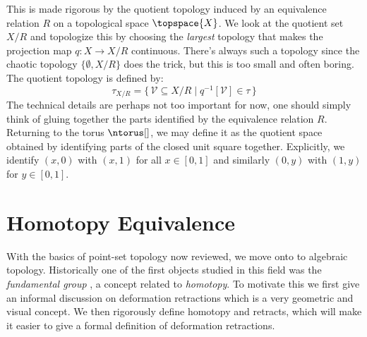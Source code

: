 \documentclass{book}                                                           %
\begin{document}
                This is made rigorous by the quotient topology induced by an
                equivalence relation $R$ on a topological space
                $\topspace{X}$. We look at the quotient
                set $X/R$ and topologize this by choosing the \textit{largest}
                topology that makes the projection map $q:X\rightarrow{X}/R$
                continuous. There's always such a topology since the chaotic
                topology $\{\emptyset,X/R\}$ does the trick, but this is too
                small and often boring. The quotient topology is defined by:%
                \begin{equation}
                    \tau_{X/R}=\{\,\mathcal{V}\subseteq{X}/R\;|\;
                        q^{\minus{1}}[\mathcal{V}]\in\tau\,\}
                \end{equation}
                The technical details are perhaps not too important for now, one
                should simply think of gluing together the parts identified by
                the equivalence relation $R$. Returning to the torus
                $\ntorus[]$, we may define it as the quotient space obtained by
                identifying parts of the closed unit square together.
                Explicitly, we identify $(x,0)$ with $(x,1)$ for all $x\in[0,1]$
                and similarly $(0,y)$ with $(1,y)$ for $y\in[0,1]$.
        \section{Homotopy Equivalence}
            With the basics of point-set topology now reviewed, we move onto to
            algebraic topology. Historically one of the first objects studied in
            this field was the \textit{fundamental group}%
            , a concept related to \textit{homotopy}.
            To motivate this we first give an informal discussion on deformation
            retractions which is a very geometric and visual concept. We then
            rigorously define homotopy and retracts, which will make it easier
            to give a formal definition of deformation retractions.
\end{document}
